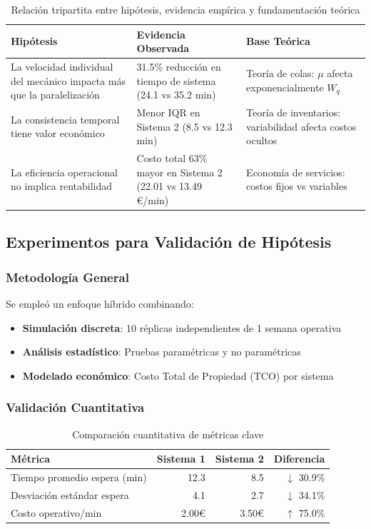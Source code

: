 \documentclass[a4paper, 12pt]{article}
\begin{document}
 \begin{table}[H]
 	\centering
 	\begin{tabular}{p{3cm}p{4.5cm}p{4.5cm}}
 		\toprule
 		\textbf{Hipótesis} & \textbf{Evidencia Observada} & \textbf{Base Teórica} \\
 		\midrule
 		La velocidad individual del mecánico impacta más que la paralelización & 31.5\% reducción en tiempo de sistema (24.1 vs 35.2 min) & Teoría de colas: $\mu$ afecta exponencialmente $W_q$ \\
 		\addlinespace
 		La consistencia temporal tiene valor económico & Menor IQR en Sistema 2 (8.5 vs 12.3 min) & Teoría de inventarios: variabilidad afecta costos ocultos \\
 		\addlinespace
 		La eficiencia operacional no implica rentabilidad & Costo total 63\% mayor en Sistema 2 (22.01 vs 13.49 €/min) & Economía de servicios: costos fijos vs variables \\
 		\bottomrule
 	\end{tabular}
 	\caption{Relación tripartita entre hipótesis, evidencia empírica y fundamentación teórica}
 	\label{tab:hipotesis}
 \end{table}
 
 \subsection{Experimentos para Validación de Hipótesis}
 
 \subsubsection{Metodología General}
 Se empleó un enfoque híbrido combinando:
 \begin{itemize}
 	\item \textbf{Simulación discreta}: 10 réplicas independientes de 1 semana operativa
 	\item \textbf{Análisis estadístico}: Pruebas paramétricas y no paramétricas
 	\item \textbf{Modelado económico}: Costo Total de Propiedad (TCO) por sistema
 \end{itemize}
 
 \subsubsection{Validación Cuantitativa}
 \begin{table}[H]
 	\centering
 	\begin{tabular}{lrrr}
 		\toprule
 		\textbf{Métrica} & \textbf{Sistema 1} & \textbf{Sistema 2} & \textbf{Diferencia} \\
 		\midrule
 		Tiempo promedio espera (min) & 12.3 & 8.5 & $\downarrow$ 30.9\% \\
 		Desviación estándar espera & 4.1 & 2.7 & $\downarrow$ 34.1\% \\
 		Costo operativo/min & 2.00€ & 3.50€ & $\uparrow$ 75.0\% \\
 		\bottomrule
 	\end{tabular}
 	\caption{Comparación cuantitativa de métricas clave}
 	\label{tab:validacion}
 \end{table}
 
\end{document}
